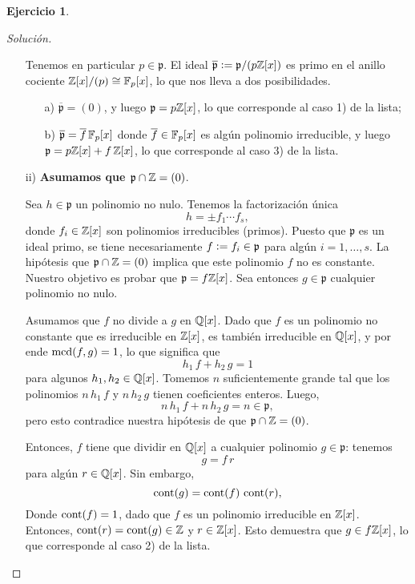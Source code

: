 \documentclass{article}
\theoremstyle{definition}
\newtheorem{ejerc}{Ejercicio}
\newenvironment{solucion}{\begin{proof}[Solución]}{\end{proof}}
\begin{document}
\begin{ejerc}
\begin{solucion}
\begin{itemize}
      Tenemos en particular $p \in \mathfrak{p}$. El ideal
      $\overline{\mathfrak{p}} \mathrel{\mathop:}= \mathfrak{p} / (p\mathbb{Z} [x])$ es primo en el
      anillo cociente $\mathbb{Z} [x]/(p) \cong \mathbb{F}_p [x]$, lo que nos lleva a dos
      posibilidades.

      \begin{itemize}
      \item[a)] $\overline{\mathfrak{p}} = (0)$, y luego
        $\mathfrak{p} = p\mathbb{Z}[x]$, lo que corresponde al caso 1) de la lista;

      \item[b)] $\overline{\mathfrak{p}} = \overline{f}\,\mathbb{F}_p [x]$ donde
        $\overline{f} \in \mathbb{F}_p [x]$ es algún polinomio irreducible, y luego
        $\mathfrak{p} = p\mathbb{Z} [x] + f\,\mathbb{Z} [x]$, lo que corresponde al caso 3) de
        la lista.
      \end{itemize}

    \item[ii)] \textbf{Asumamos que $\mathfrak{p} \cap \mathbb{Z} = (0)$}.

      Sea $h \in \mathfrak{p}$ un polinomio no nulo. Tenemos la factorización
      única
      $$h = \pm f_1 \cdots f_s,$$
      donde $f_i \in \mathbb{Z} [x]$ son polinomios irreducibles (primos). Puesto que
      $\mathfrak{p}$ es un ideal primo, se tiene necesariamente
      $f \mathrel{\mathop:}= f_i \in \mathfrak{p}$ para algún $i = 1,\ldots,s$. La hipótesis
      que $\mathfrak{p} \cap \mathbb{Z} = (0)$ implica que este polinomio $f$ no es
      constante. Nuestro objetivo es probar que $\mathfrak{p} = f \mathbb{Z} [x]$.
      Sea entonces $g\in \mathfrak{p}$ cualquier polinomio no nulo.

      Asumamos que $f$ no divide a $g$ en $\mathbb{Q} [x]$. Dado que $f$ es un
      polinomio no constante que es irreducible en $\mathbb{Z} [x]$, es también
      irreducible en $\mathbb{Q} [x]$, y por ende $\operatorname{mcd} (f, g) = 1$, lo que significa
      que
      $$h_1\,f + h_2\,g = 1$$
      para algunos $h_1,h_2\in \mathbb{Q} [x]$. Tomemos $n$ suficientemente grande tal
      que los polinomios $n\,h_1\,f$ y $n\,h_2\,g$ tienen coeficientes
      enteros. Luego,
      $$n\,h_1\,f + n\,h_2\,g = n \in \mathfrak{p},$$
      pero esto contradice nuestra hipótesis de que
      $\mathfrak{p} \cap \mathbb{Z} = (0)$.

      Entonces, $f$ tiene que dividir en $\mathbb{Q} [x]$ a cualquier polinomio
      $g \in \mathfrak{p}$: tenemos
      $$g = f\,r$$
      para algún $r \in \mathbb{Q} [x]$. Sin embargo,
      $$\operatorname{cont} (g) = \operatorname{cont} (f)\,\operatorname{cont} (r),$$
      Donde $\operatorname{cont} (f) = 1$, dado que $f$ es un polinomio irreducible en
      $\mathbb{Z} [x]$. Entonces, $\operatorname{cont} (r) = \operatorname{cont} (g) \in \mathbb{Z}$ y $r \in \mathbb{Z}
      [x]$. Esto demuestra que $g \in f\mathbb{Z} [x]$, lo que corresponde al caso 2)
      de la lista. \qedhere
    \end{itemize}
  \end{solucion}\fi
\end{ejerc}
\end{document}
